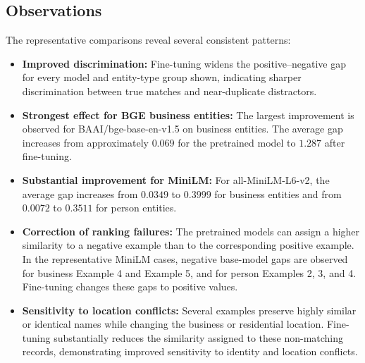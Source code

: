 \documentclass{article}
\begin{document}
\subsection{Observations}

The representative comparisons reveal several consistent patterns:

\begin{itemize}
    \item \textbf{Improved discrimination:}
    Fine-tuning widens the positive--negative gap for every model and
    entity-type group shown, indicating sharper discrimination between
    true matches and near-duplicate distractors.

    \item \textbf{Strongest effect for BGE business entities:}
    The largest improvement is observed for BAAI/bge-base-en-v1.5 on
    business entities. The average gap increases from approximately
    $0.069$ for the pretrained model to $1.287$ after fine-tuning.

    \item \textbf{Substantial improvement for MiniLM:}
    For all-MiniLM-L6-v2, the average gap increases from $0.0349$ to
    $0.3999$ for business entities and from $0.0072$ to $0.3511$
    for person entities.

    \item \textbf{Correction of ranking failures:}
    The pretrained models can assign a higher similarity to a negative
    example than to the corresponding positive example. In the representative
    MiniLM cases, negative base-model gaps are observed for business
    Example 4 and Example 5, and for person Examples 2, 3, and 4.
    Fine-tuning changes these gaps to positive values.

    \item \textbf{Sensitivity to location conflicts:}
    Several examples preserve highly similar or identical names while
    changing the business or residential location. Fine-tuning substantially
    reduces the similarity assigned to these non-matching records,
    demonstrating improved sensitivity to identity and location conflicts.
\end{itemize}
\end{document}
